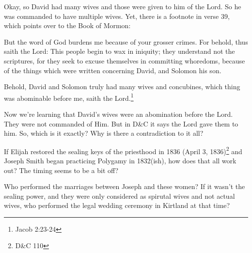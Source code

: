 Okay, so David had many wives and those were given to him of the Lord. So he was
commanded to have multiple wives. Yet, there is a footnote in verse 39, which points
over to the Book of Mormon:

\begin{displayquote}
But the word of God burdens me because of your grosser crimes. For behold, 
thus saith the Lord: This people begin to wax in iniquity; they understand not the 
scriptures, for they seek to excuse themselves in committing whoredoms, because of 
the things which were written concerning David, and Solomon his son.

Behold, David and Solomon truly had many wives and concubines, which thing was 
abominable before me, saith the Lord.\footnote{Jacob 2:23-24}
\end{displayquote}

Now we're learning that David's wives were an abomination before the Lord. They were
not commanded of Him. But in D\&C it says the Lord gave them to him. So, which is it
exactly? Why is there a contradiction to it all?

If Elijah restored the sealing keys of the priesthood in 1836 (April 3,
  1836)\footnote{D\&C 110} and Joseph Smith began practicing Polygamy in 1832(ish),
  how does that all work out? The timing seems to be a bit off?

Who performed the marriages between Joseph and these women? If it wasn't the sealing
power, and they were only considered as spirutal wives and not actual wives, who
performed the legal wedding ceremony in Kirtland at that time?